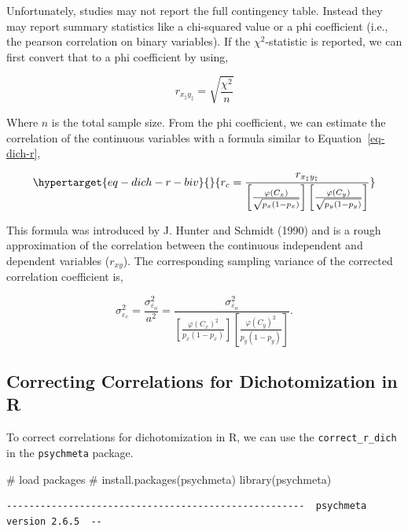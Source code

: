 \documentclass[
  letterpaper,
  DIV=11,
  numbers=noendperiod]{scrreprt}
\newenvironment{Shaded}{\begin{snugshade}}{\end{snugshade}}
\newcommand{\CommentTok}[1]{\textcolor[rgb]{0.37,0.37,0.37}{#1}}
\newcommand{\FunctionTok}[1]{\textcolor[rgb]{0.28,0.35,0.67}{#1}}
\newcommand{\NormalTok}[1]{\textcolor[rgb]{0.00,0.23,0.31}{#1}}
\begin{document}
Unfortunately, studies may not report the full contingency table.
Instead they may report summary statistics like a chi-squared value or a
phi coefficient (i.e., the pearson correlation on binary variables). If
the \(\chi^2\)-statistic is reported, we can first convert that to a phi
coefficient by using,

\[
r_{x_\ddagger y_\ddagger} = \sqrt{\frac{\chi^2}{n}}
\]

Where \(n\) is the total sample size. From the phi coefficient, we can
estimate the correlation of the continuous variables with a formula
similar to Equation~\ref{eq-dich-r},

\begin{equation}\protect\hypertarget{eq-dich-r-biv}{}{
r_c = \frac{r_{x_\ddagger y_\ddagger}}{\left[\frac{\varphi(C_x)}{\sqrt{p_x(1-p_x)}} \right]\left[\frac{\varphi(C_y)}{\sqrt{p_y(1-p_y)}} \right]}
}\label{eq-dich-r-biv}\end{equation}

This formula was introduced by J. Hunter and Schmidt (1990) and is a
rough approximation of the correlation between the continuous
independent and dependent variables (\(r_{xy}\)). The corresponding
sampling variance of the corrected correlation coefficient is,

\[
\sigma^2_{\varepsilon_c} =\frac{\sigma^2_{\varepsilon_o}} {a^2} =\frac{\sigma^2_{\varepsilon_o}} {\left[\frac{\varphi(C_x)^2}{p_x(1-p_x)} \right]\left[\frac{\varphi(C_y)^2}{p_y(1-p_y)} \right]}.
\]

\hypertarget{correcting-correlations-for-dichotomization-in-r}{%
\subsection{Correcting Correlations for Dichotomization in
R}\label{correcting-correlations-for-dichotomization-in-r}}

To correct correlations for dichotomization in R, we can use the
\texttt{correct\_r\_dich} in the \texttt{psychmeta} package.

\begin{Shaded}
\begin{Highlighting}[]
\CommentTok{\# load packages}
\CommentTok{\# install.packages(\textquotesingle{}psychmeta\textquotesingle{})}
\FunctionTok{library}\NormalTok{(psychmeta)}
\end{Highlighting}
\end{Shaded}

\begin{verbatim}
-----------------------------------------------------  psychmeta version 2.6.5  --
\end{verbatim}
\end{document}
